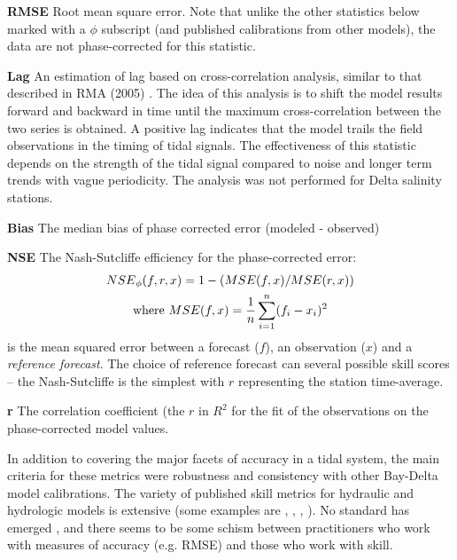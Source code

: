 \begin{description}
  \item{{\textbf{RMSE}}} Root mean square error. Note that unlike the other statistics 
	below marked with a $\phi$ subscript (and published calibrations from other models), 
	the data are not phase-corrected for this statistic.
  \item{{\textbf{Lag}}} An estimation of lag based on cross-correlation analysis, 
	similar to that described in RMA (2005) \cite{RMA05}. The idea of this analysis is to shift
	the model results forward and backward in time until the maximum cross-correlation 
	between the two series is obtained. A positive lag indicates that the model trails the
	field observations in the timing of tidal signals. The effectiveness
	of this statistic depends on the strength of the tidal signal compared to noise and longer term trends with vague     
	periodicity. The analysis was not performed for Delta salinity stations.
	\item{\textbf{Bias}\subphi} The median bias  of phase corrected error (modeled - observed)
	\item{\textbf{NSE}\subphi} The Nash-Sutcliffe efficiency for the phase-corrected error:
	\begin{gather}
	NSE\textsubscript{$\phi$}(f,r,x) = 1 - (MSE(f,x)/MSE(r,x)) \\
	\text{where} ~ MSE(f,x) = \frac{1}{n} \sum\limits_{i=1}^{n}(f_i - x_i)^2 \\
	\end{gather} is the mean squared error between a forecast ($f$), an observation ($x$) 
	and a {\em reference forecast}. The choice of 
	reference forecast can several possible skill scores -- 
	the Nash-Sutcliffe is the simplest with $r$ representing the station time-average.
	\item{\textbf{r}\subphi} The correlation coefficient (the $r$ in $R^2$ for the fit 
	of the observations on the phase-corrected model values.
\end{description}


In addition to covering the major facets of accuracy in a tidal
system, the main criteria for these metrics were robustness and consistency with
other Bay-Delta model calibrations. The variety of published skill metrics for hydraulic and hydrologic models is extensive 
(some examples are \citet{Willmott82,Willmott85,Willmott12}, \cite{Stow09}, \cite{Murphy88}, \cite{Ralston2006}). 
No standard has emerged \citep{Stow09}, and there seems to be some schism between practitioners who work with 
measures of accuracy (e.g. RMSE) and those who work with skill. 

